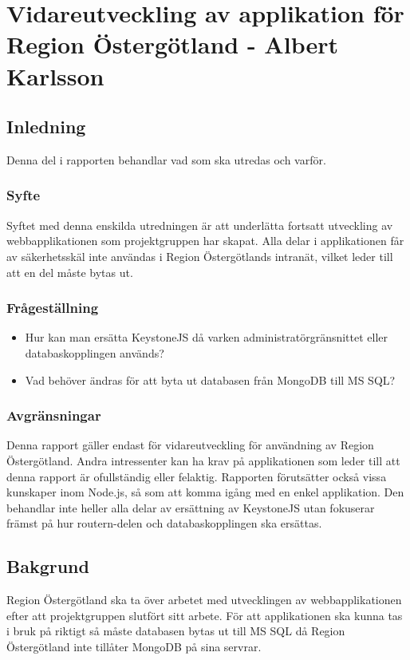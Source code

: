 \section{Vidareutveckling av applikation för Region Östergötland - Albert Karlsson}
\subsection{Inledning}
Denna del i rapporten behandlar vad som ska utredas och varför.
\subsubsection{Syfte}
Syftet med denna enskilda utredningen är att underlätta fortsatt utveckling av webbapplikationen som projektgruppen har skapat. Alla delar i applikationen får av säkerhetsskäl inte användas i Region Östergötlands intranät, vilket leder till att en del måste bytas ut.

\subsubsection{Frågeställning}
\begin{itemize}
\item Hur kan man ersätta KeystoneJS då varken administratörgränsnittet eller databaskopplingen används?
\item Vad behöver ändras för att byta ut databasen från MongoDB till MS SQL?
\end{itemize}
\subsubsection{Avgränsningar}
Denna rapport gäller endast för vidareutveckling för användning av Region Östergötland. Andra intressenter kan ha krav på applikationen som leder till att denna rapport är ofullständig eller felaktig. Rapporten förutsätter också vissa kunskaper inom Node.js, så som att komma igång med en enkel applikation. Den behandlar inte heller alla delar av ersättning av KeystoneJS utan fokuserar främst på hur routern-delen och databaskopplingen ska ersättas.  
\subsection{Bakgrund}
Region Östergötland ska ta över arbetet med utvecklingen av webbapplikationen efter att projektgruppen slutfört sitt arbete. För att applikationen ska kunna tas i bruk på riktigt så måste databasen bytas ut till MS SQL då Region Östergötland inte tillåter MongoDB på sina servrar. 

